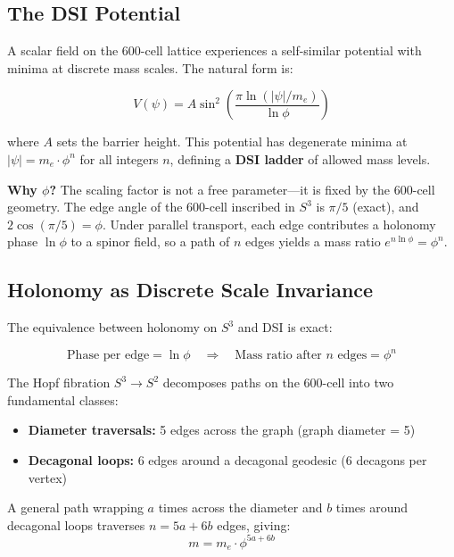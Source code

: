 \documentclass[12pt,a4paper]{article}
\begin{document}
\subsection{The DSI Potential}

A scalar field on the 600-cell lattice experiences a self-similar potential with minima at discrete mass scales. The natural form is:

\begin{equation}
\boxed{V(\psi) = A \sin^2\!\left(\frac{\pi \ln(|\psi|/m_e)}{\ln\phi}\right)}
\label{eq:dsi_potential}
\end{equation}

where $A$ sets the barrier height. This potential has degenerate minima at $|\psi| = m_e \cdot \phi^n$ for all integers $n$, defining a \textbf{DSI ladder} of allowed mass levels.

\textbf{Why $\phi$?} The scaling factor is not a free parameter---it is fixed by the 600-cell geometry. The edge angle of the 600-cell inscribed in $S^3$ is $\pi/5$ (exact), and $2\cos(\pi/5) = \phi$. Under parallel transport, each edge contributes a holonomy phase $\ln\phi$ to a spinor field, so a path of $n$ edges yields a mass ratio $e^{n\ln\phi} = \phi^n$.

\subsection{Holonomy as Discrete Scale Invariance}

The equivalence between holonomy on $S^3$ and DSI is exact:

\begin{equation}
\text{Phase per edge} = \ln\phi \quad \Longrightarrow \quad \text{Mass ratio after } n \text{ edges} = \phi^n
\end{equation}

The Hopf fibration $S^3 \to S^2$ decomposes paths on the 600-cell into two fundamental classes:
\begin{itemize}
    \item \textbf{Diameter traversals:} 5 edges across the graph (graph diameter = 5)
    \item \textbf{Decagonal loops:} 6 edges around a decagonal geodesic (6 decagons per vertex)
\end{itemize}

A general path wrapping $a$ times across the diameter and $b$ times around decagonal loops traverses $n = 5a + 6b$ edges, giving:
\begin{equation}
m = m_e \cdot \phi^{5a + 6b}
\end{equation}
\end{document}
